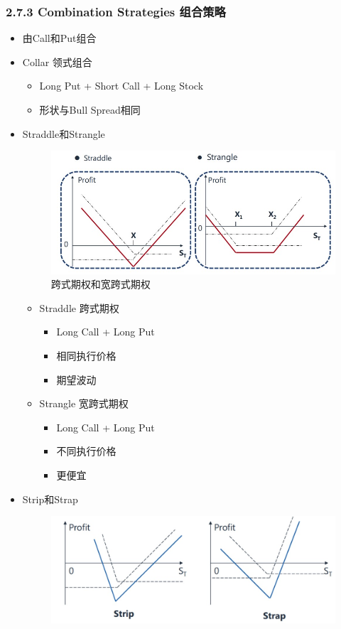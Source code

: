 \documentclass[a4paper,6pt,twoside,openany]{article}
\begin{document}
\subsubsection*{2.7.3 Combination Strategies 组合策略}
\begin{itemize}
\item 由Call和Put组合
\item Collar 领式组合
  \begin{itemize}
  \item Long Put + Short Call + Long Stock
  \item 形状与Bull Spread相同
  \end{itemize}
\item Straddle和Strangle
  \begin{figure}[!htbp]
    \centering \includegraphics[width=150mm]{Strategy_Straddle_Strangle.jpg}
    \caption{跨式期权和宽跨式期权}
  \end{figure}
  \begin{itemize}
  \item Straddle 跨式期权
    \begin{itemize}
    \item Long Call + Long Put
    \item 相同执行价格
    \item 期望波动
    \end{itemize}
  \item Strangle 宽跨式期权
    \begin{itemize}
    \item Long Call + Long Put
    \item 不同执行价格
    \item 更便宜
    \end{itemize}
  \end{itemize}
\item Strip和Strap
  \begin{figure}[!htbp]
    \centering \includegraphics[width=150mm]{Strategy_Strip_Strap.jpg}

\end{figure}
\end{itemize}
\end{document}

